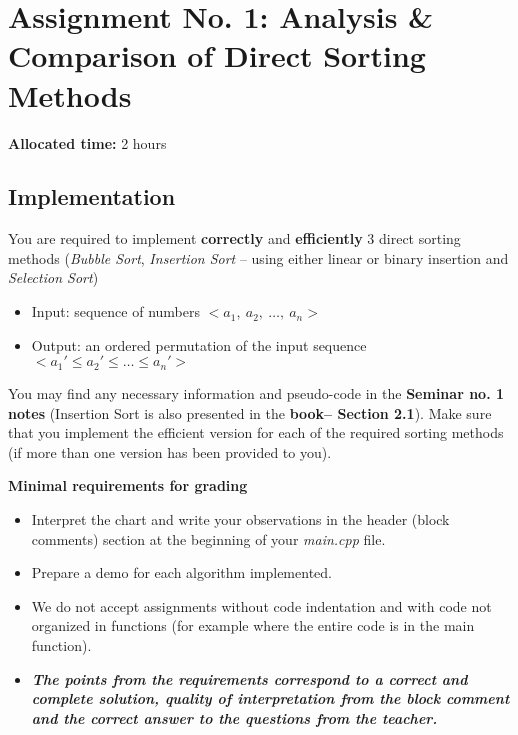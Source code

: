 \documentclass[../en-fa-lab.tex]{subfiles}
\begin{document}
\section{\texorpdfstring{\textbf{Assignment No. 1: Analysis \& Comparison of Direct Sorting
Methods}}{Assignment No. 1: Analysis \& Comparison of Direct Sorting
Methods}}\label{assign1}

\textbf{Allocated time:} 2 hours

\subsection{Implementation}\label{implementation}

You are required to implement \textbf{correctly} and
\textbf{efficiently} 3 direct sorting methods (\emph{Bubble Sort},
\emph{Insertion Sort} -- using either linear or binary insertion and
\emph{Selection Sort})

\begin{itemize}
\item
  Input: sequence of numbers \(< a_{1},\ a_{2},\ \ldots,\ a_{n} >\)
\item
  Output: an ordered permutation of the input sequence
  \({< a}_{1}' \leq a_{2}' \leq \ldots \leq a_{n}' >\)
\end{itemize}

You may find any necessary information and pseudo-code in the
\textbf{Seminar no. 1 notes} (Insertion Sort is also presented in the
\textbf{book\citep{cormen}-- Section 2.1}). Make sure that you
implement the efficient version for each of the required sorting methods
(if more than one version has been provided to you).

\textbf{Minimal requirements for grading}

\begin{itemize}
\item
  Interpret the chart and write your observations in the header (block
  comments) section at the beginning of your \emph{main.cpp} file.
\end{itemize}

\begin{itemize}
\item
  Prepare a demo for each algorithm implemented.
\item
  We do not accept assignments without code indentation and with code
  not organized in functions (for example where the entire code is in
  the main function).
\item
  \emph{\textbf{The points from the requirements correspond to a correct
  and complete solution, quality of interpretation from the block
  comment and the correct answer to the questions from the teacher.}}
\end{itemize}
\end{document}
